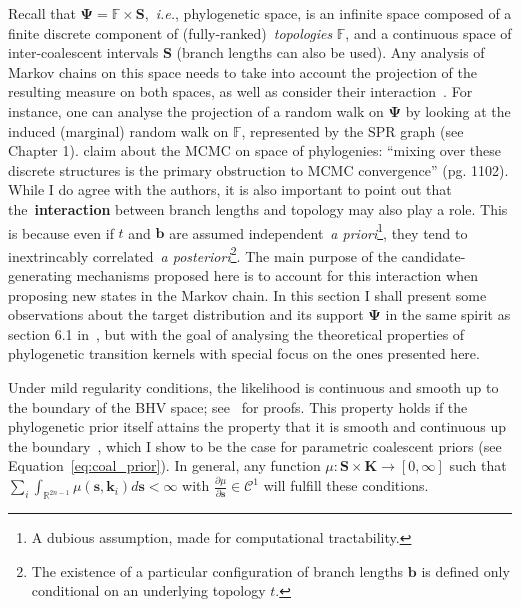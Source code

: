 Recall that $\boldsymbol\Psi = \mathbb{F} \times \mathbf{S}$,~\textit{i.e.}, phylogenetic space, is an infinite space composed of a finite discrete component of (fully-ranked)~\textit{topologies} $\mathbb{F}$, and a continuous space of inter-coalescent intervals $\mathbf{S}$ (branch lengths can also be used).
Any analysis of Markov chains on this space needs to take into account the projection of the resulting measure on both spaces, as well as consider their interaction~\citep{Gavryushkin2016b}.
For instance, one can analyse the projection of a random walk on $\boldsymbol\Psi$ by looking at the induced (marginal) random walk on $\mathbb{F}$, represented by the SPR graph (see Chapter 1).
\cite{Gavryushkin2016} claim about the MCMC on space of phylogenies: ``mixing over these discrete structures is the primary obstruction to MCMC convergence'' (pg. 1102).
While I do agree with the authors, it is also important to point out that the~\textbf{interaction} between branch lengths and topology may also play a role.
This is because even if $t$ and $\boldsymbol b$ are assumed independent~\textit{a priori}\footnote{A dubious assumption, made for computational tractability.}, they tend to inextrincably correlated~\textit{a posteriori}\footnote{The existence of a particular configuration of branch lengths $\boldsymbol b$ is defined only conditional on an underlying topology $t$.}.
The main purpose of the candidate-generating mechanisms proposed here is to account for this interaction when proposing new states in the Markov chain.
In this section I shall present some observations about the target distribution and its support $\boldsymbol\Psi$ in the same spirit as section 6.1 in~\cite{Dinh2017}, but with the goal of analysing the theoretical properties of phylogenetic transition kernels with special focus on the ones presented here.

Under mild regularity conditions, the likelihood is continuous and smooth up to the boundary of the BHV space; see~\cite{Dinh2017} for proofs.
This  property holds if the phylogenetic prior itself attains the property that it is smooth and continuous up the boundary~\citep[Assumption 2.3]{Dinh2017},
which I show to be the case for parametric coalescent priors (see Equation~\ref{eq:coal_prior}).
In general, any function $\mu : \boldsymbol S \times \boldsymbol K \to [0, \infty]$ such that $\sum_i\int_{\mathbb{R}^{2n-1}} \mu (\boldsymbol s, \boldsymbol k_i) d\boldsymbol s < \infty$ with $\frac{\partial \mu}{\partial \boldsymbol s} \in \mathcal{C}^1$  will fulfill these conditions.   

